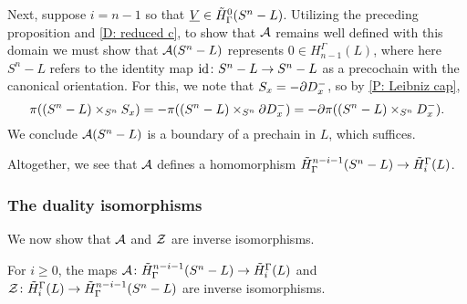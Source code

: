 Next, suppose $i = n-1$ so that $\underline{V} \in \tilde H^0_\Gamma(S^n-L)$.
Utilizing the preceding proposition and \cref{D: reduced c}, to show that $\mathcal{A}$ remains well defined with this domain we must show that $\mathcal{A}(S^n-L)$ represents $0 \in H_{n-1}^\Gamma(L)$, where here $S^n - L$ refers to the identity map $\mathrm{id} \colon S^n - L \to S^n - L$ as a precochain with the canonical orientation.
For this, we note that $S_x = - \partial D_x^-$, so by \cref{P: Leibniz cap},
$$\pi((S^n-L) \times_{S^n} S_x) = -\pi((S^n-L) \times_{S^n} \partial D_x^-) = -\partial \pi((S^n-L) \times_{S^n} D_x^-).$$
We conclude $\mathcal{A}(S^n - L)$ is a boundary of a prechain in $L$, which suffices.

Altogether, we see that $\mathcal{A}$ defines a homomorphism $\tilde H^{n-i-1}_\Gamma(S^n - L) \to \tilde H_i^\Gamma(L)$.



\subsubsection{The duality isomorphisms} We now show that $\mathcal{A}$ and $\mathcal{Z}$ are inverse isomorphisms.


\begin{theorem}\label{T: alex duality}
	For $i \geq 0$, the maps $\mathcal{A} \colon \tilde H^{n-i-1}_\Gamma(S^n-L) \to \tilde H_i^\Gamma(L)$ and $\mathcal{Z} \colon \tilde H_i^\Gamma(L) \to \tilde H^{n-i-1}_\Gamma(S^n-L)$ are inverse isomorphisms.
\end{theorem}

